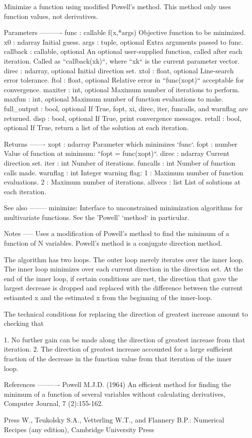 \begin{DoxyVerb}Minimize a function using modified Powell's method. This method
only uses function values, not derivatives.

Parameters
----------
func : callable f(x,*args)
    Objective function to be minimized.
x0 : ndarray
    Initial guess.
args : tuple, optional
    Extra arguments passed to func.
callback : callable, optional
    An optional user-supplied function, called after each
    iteration.  Called as ``callback(xk)``, where ``xk`` is the
    current parameter vector.
direc : ndarray, optional
    Initial direction set.
xtol : float, optional
    Line-search error tolerance.
ftol : float, optional
    Relative error in ``func(xopt)`` acceptable for convergence.
maxiter : int, optional
    Maximum number of iterations to perform.
maxfun : int, optional
    Maximum number of function evaluations to make.
full_output : bool, optional
    If True, fopt, xi, direc, iter, funcalls, and
    warnflag are returned.
disp : bool, optional
    If True, print convergence messages.
retall : bool, optional
    If True, return a list of the solution at each iteration.

Returns
-------
xopt : ndarray
    Parameter which minimizes `func`.
fopt : number
    Value of function at minimum: ``fopt = func(xopt)``.
direc : ndarray
    Current direction set.
iter : int
    Number of iterations.
funcalls : int
    Number of function calls made.
warnflag : int
    Integer warning flag:
        1 : Maximum number of function evaluations.
        2 : Maximum number of iterations.
allvecs : list
    List of solutions at each iteration.

See also
--------
minimize: Interface to unconstrained minimization algorithms for
    multivariate functions. See the 'Powell' `method` in particular.

Notes
-----
Uses a modification of Powell's method to find the minimum of
a function of N variables. Powell's method is a conjugate
direction method.

The algorithm has two loops. The outer loop
merely iterates over the inner loop. The inner loop minimizes
over each current direction in the direction set. At the end
of the inner loop, if certain conditions are met, the direction
that gave the largest decrease is dropped and replaced with
the difference between the current estiamted x and the estimated
x from the beginning of the inner-loop.

The technical conditions for replacing the direction of greatest
increase amount to checking that

1. No further gain can be made along the direction of greatest increase
   from that iteration.
2. The direction of greatest increase accounted for a large sufficient
   fraction of the decrease in the function value from that iteration of
   the inner loop.

References
----------
Powell M.J.D. (1964) An efficient method for finding the minimum of a
function of several variables without calculating derivatives,
Computer Journal, 7 (2):155-162.

Press W., Teukolsky S.A., Vetterling W.T., and Flannery B.P.:
Numerical Recipes (any edition), Cambridge University Press\end{DoxyVerb}
